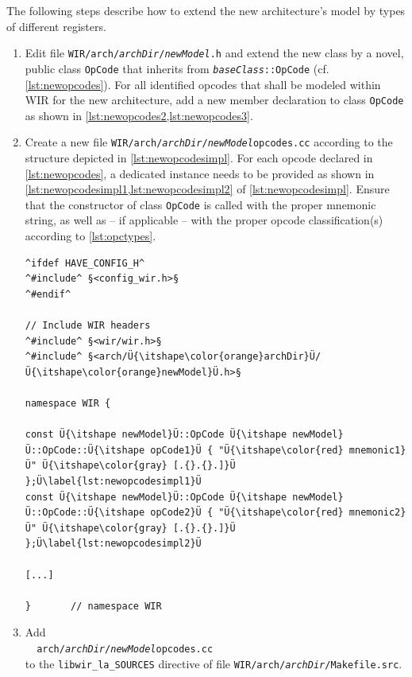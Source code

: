 The following steps describe how to extend the new architecture's model by types of different registers.
\begin{enumerate}[resume]
  \item Edit file \texttt{WIR/arch/{\itshape archDir}/{\itshape newModel}.h} and extend the new class by a novel, public class \texttt{OpCode} that inherits from \texttt{{\itshape baseClass}::OpCode} (cf. \cref{lst:newopcodes}).
  For all identified opcodes that shall be modeled within \gls{WIR} for the new architecture, add a new member declaration to class \texttt{OpCode} as shown in \cref{lst:newopcodes2,lst:newopcodes3}.

  \item Create a new file \texttt{WIR/arch/{\itshape archDir}/{\itshape newModel}opcodes.cc} according to the structure depicted in \cref{lst:newopcodesimpl}.
  For each opcode declared in \cref{lst:newopcodes}, a dedicated instance needs to be provided as shown in \cref{lst:newopcodesimpl1,lst:newopcodesimpl2} of \cref{lst:newopcodesimpl}.
  Ensure that the constructor of class \texttt{OpCode} is called with the proper mnemonic string, as well as -- if applicable -- with the proper opcode classification(s) according to \cref{lst:opctypes}.

\begin{lstlisting}[style=code,float=!t,caption={Implementation of a New Processor Model's Opcodes},label=lst:newopcodesimpl]
^ifdef HAVE_CONFIG_H^
^#include^ §<config_wir.h>§
^#endif^

// Include WIR headers
^#include^ §<wir/wir.h>§
^#include^ §<arch/Ü{\itshape\color{orange}archDir}Ü/Ü{\itshape\color{orange}newModel}Ü.h>§

namespace WIR {

const Ü{\itshape newModel}Ü::OpCode Ü{\itshape newModel}Ü::OpCode::Ü{\itshape opCode1}Ü { "Ü{\itshape\color{red} mnemonic1}Ü" Ü{\itshape\color{gray} [.{}.{}.]}Ü };Ü\label{lst:newopcodesimpl1}Ü
const Ü{\itshape newModel}Ü::OpCode Ü{\itshape newModel}Ü::OpCode::Ü{\itshape opCode2}Ü { "Ü{\itshape\color{red} mnemonic2}Ü" Ü{\itshape\color{gray} [.{}.{}.]}Ü };Ü\label{lst:newopcodesimpl2}Ü

[...]

}       // namespace WIR
\end{lstlisting}

  \item Add \\
  \verb|  arch/|\texttt{\itshape archDir}\verb|/|\texttt{\itshape newModel}\verb|opcodes.cc| \\
  to the \texttt{libwir\_la\_SOURCES} directive of file \texttt{WIR/arch/{\itshape archDir}/Makefile.src}.
\end{enumerate}


